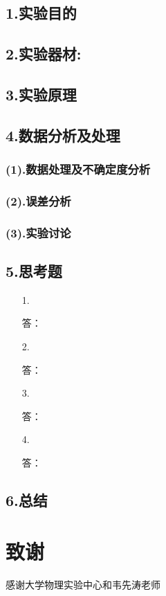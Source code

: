 \documentclass[utf8]{ctexart}
\begin{document}
	\subsection*{1.实验目的}	

	\subsection*{2.实验器材:} 
	
	\subsection*{3.实验原理}
	
	
	
	
	\subsection*{4.数据分析及处理}
	\subsubsection*{(1).数据处理及不确定度分析}
	
	
	
	\subsubsection*{(2).误差分析}
	
	\subsubsection*{(3).实验讨论}
	
	\subsection*{5.思考题}
	\begin{itemize}
		\item [1.]
		\item [ ]答：
		\item [2.]
		\item [ ]答：
		\item [3.]
		\item [ ]答：
		\item [4.]
		\item [ ]答：
	\end{itemize}
	
	
	\subsection*{6.总结}
	
	\section*{致谢}
	
	\begin{center}
		感谢\cite{bk1}大学物理实验中心和韦先涛老师
	\end{center}
	
	
	
	\label{unknown}
\end{document}
